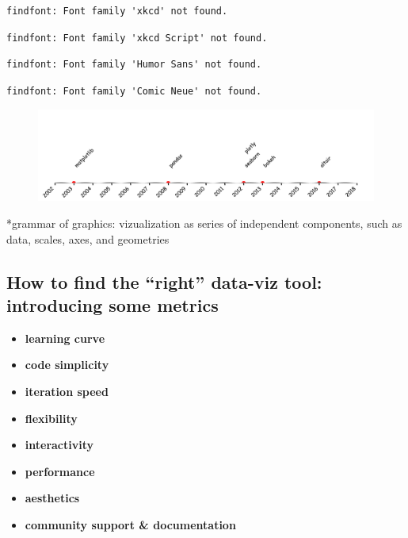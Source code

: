 \documentclass[
  letterpaper,
  DIV=11,
  numbers=noendperiod]{scrartcl}
\providecommand{\tightlist}{%
  \setlength{\itemsep}{0pt}\setlength{\parskip}{0pt}}\usepackage{longtable,booktabs,array}
\begin{document}
\begin{verbatim}
findfont: Font family 'xkcd' not found.
\end{verbatim}

\begin{verbatim}
findfont: Font family 'xkcd Script' not found.
\end{verbatim}

\begin{verbatim}
findfont: Font family 'Humor Sans' not found.
\end{verbatim}

\begin{verbatim}
findfont: Font family 'Comic Neue' not found.
\end{verbatim}

\begin{figure}[H]

{\centering \includegraphics{plotting_libs_eda_files/figure-pdf/cell-4-output-377.pdf}

}

\end{figure}

*grammar of graphics: vizualization as series of independent components,
such as data, scales, axes, and geometries

\hypertarget{how-to-find-the-right-data-viz-tool-introducing-some-metrics}{%
\subsection{How to find the ``right'' data-viz tool: introducing some
metrics}\label{how-to-find-the-right-data-viz-tool-introducing-some-metrics}}

\begin{itemize}
\tightlist
\item
  \textbf{learning curve}
\item
  \textbf{code simplicity}
\item
  \textbf{iteration speed}
\item
  \textbf{flexibility}
\item
  \textbf{interactivity}
\item
  \textbf{performance}
\item
  \textbf{aesthetics}
\item
  \textbf{community support \& documentation}
\end{itemize}
\end{document}
